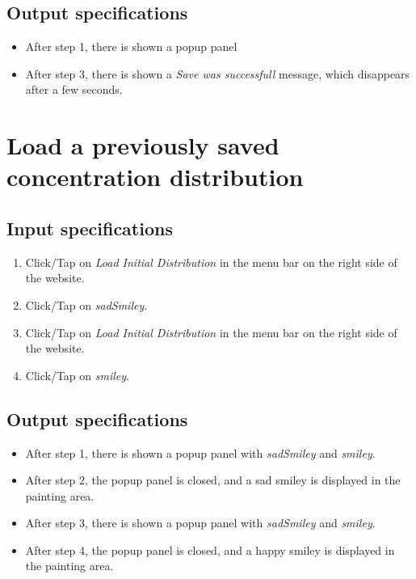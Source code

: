 \subsection*{Output specifications}
\begin{itemize}
\item After step 1, there is shown a popup panel
\item After step 3, there is shown a \emph{Save was successfull} message, which disappears after a few seconds.
\end{itemize}

\section{Load a previously saved concentration distribution}

\subsection*{Input specifications}
\begin{enumerate}
\item Click/Tap on \emph{Load Initial Distribution} in the menu bar on the right side of the website.
\item Click/Tap on \emph{sadSmiley}.
\item Click/Tap on \emph{Load Initial Distribution} in the menu bar on the right side of the website.
\item Click/Tap on \emph{smiley}.
\end{enumerate}

\subsection*{Output specifications}
\begin{itemize}
\item After step 1, there is shown a popup panel with \emph{sadSmiley} and \emph{smiley}.
\item After step 2, the popup panel is closed, and a sad smiley is displayed in the painting area.
\item After step 3, there is shown a popup panel with \emph{sadSmiley} and \emph{smiley}.
\item After step 4, the popup panel is closed, and a happy smiley is displayed in the painting area.
\end{itemize}


